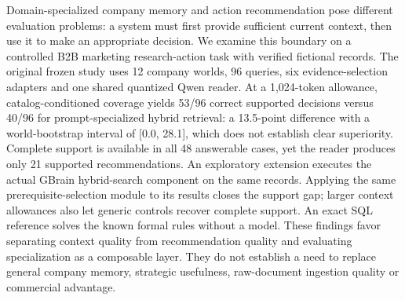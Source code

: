 Domain-specialized company memory and action recommendation pose different evaluation problems: a system must first provide sufficient current context, then use it to make an appropriate decision. We examine this boundary on a controlled B2B marketing research-action task with verified fictional records. The original frozen study uses 12 company worlds, 96 queries, six evidence-selection adapters and one shared quantized Qwen reader. At a 1,024-token allowance, catalog-conditioned coverage yields 53/96 correct supported decisions versus 40/96 for prompt-specialized hybrid retrieval: a 13.5-point difference with a world-bootstrap interval of [0.0, 28.1], which does not establish clear superiority. Complete support is available in all 48 answerable cases, yet the reader produces only 21 supported recommendations. An exploratory extension executes the actual GBrain hybrid-search component on the same records. Applying the same prerequisite-selection module to its results closes the support gap; larger context allowances also let generic controls recover complete support. An exact SQL reference solves the known formal rules without a model. These findings favor separating context quality from recommendation quality and evaluating specialization as a composable layer. They do not establish a need to replace general company memory, strategic usefulness, raw-document ingestion quality or commercial advantage.
